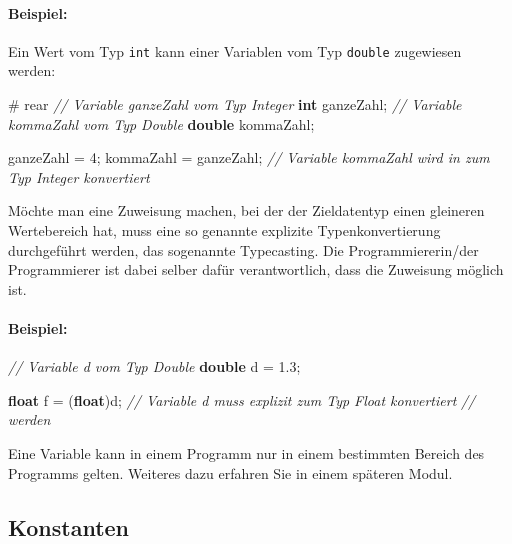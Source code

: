 \documentclass[10pt,paper=17cm:22cm, twoside=true, DIV=14]{scrbook}
\newenvironment {Shaded}
        {\begin{mdframed}[style=code] }
         {\end{mdframed}}
\newcommand{\DataTypeTok}[1]{\textcolor[rgb]{0.1,0.1,0.1}{\textbf{#1}}}
\newcommand{\DecValTok}[1]{\textcolor[rgb]{0.4,0.4,0.4}{{#1}}}
\newcommand{\FloatTok}[1]{\textcolor[rgb]{0.4,0.4,0.4}{{#1}}}
\newcommand{\CommentTok}[1]{\textcolor[RGB]{128,128,128}{\textit{#1}}}
\newcommand{\NormalTok}[1]{#1}
\begin{document}
\paragraph{Beispiel:}\label{beispiel-12}

Ein Wert vom Typ \texttt{int} kann einer Variablen vom Typ
\texttt{double} zugewiesen werden:

\begin{Shaded}
\begin{Highlighting}[]
\NormalTok{# rear}
\CommentTok{// Variable ganzeZahl vom Typ Integer}
\DataTypeTok{int} \NormalTok{ganzeZahl;}
\CommentTok{// Variable kommaZahl vom Typ Double}
\DataTypeTok{double} \NormalTok{kommaZahl;}

\NormalTok{ganzeZahl = }\DecValTok{4}\NormalTok{;}
\NormalTok{kommaZahl = ganzeZahl;}
\CommentTok{// Variable kommaZahl wird in zum Typ Integer konvertiert}
\end{Highlighting}
\end{Shaded}

Möchte man eine Zuweisung machen, bei der der Zieldatentyp einen
gleineren Wertebereich hat, muss eine so genannte explizite
Typenkonvertierung durchgeführt werden, das sogenannte Typecasting. Die
Programmiererin/der Programmierer ist dabei selber dafür verantwortlich,
dass die Zuweisung möglich ist.

\paragraph{Beispiel:}\label{beispiel-13}

\begin{Shaded}
\begin{Highlighting}[]
\CommentTok{// Variable d vom Typ Double}
\DataTypeTok{double} \NormalTok{d = }\FloatTok{1.3}\NormalTok{;}

\DataTypeTok{float} \NormalTok{f = (}\DataTypeTok{float}\NormalTok{)d;}
\CommentTok{// Variable d muss explizit zum Typ Float konvertiert }
\CommentTok{// werden}
\end{Highlighting}
\end{Shaded}

Eine Variable kann in einem Programm nur in einem bestimmten Bereich des
Programms gelten. Weiteres dazu erfahren Sie in einem späteren Modul.

\subsection{Konstanten}\label{konstanten-1}
\end{document}
